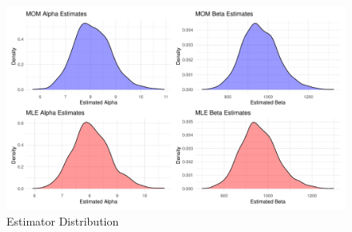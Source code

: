 \documentclass{article}\usepackage[]{graphicx}\usepackage[]{xcolor}
\begin{document}
\begin{figure}[ht]
  \begin{center}
  \includegraphics[width=\textwidth]{estimator.plot.pdf}
  \caption{Estimator Distribution}
  \label{plot4}
  \end{center}
\end{figure}
\end{document}
